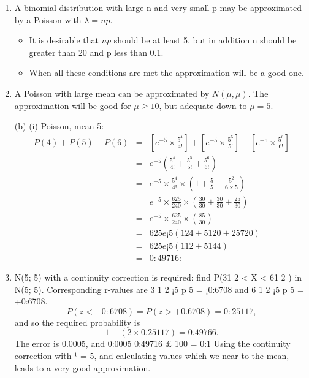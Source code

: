 \documentclass[a4paper,12pt]{article}
\begin{document}
\begin{enumerate}
\item A binomial distribution with large n and very small p may be approximated
by a Poisson with $\lambda = np$. 
\begin{itemize}
\item It is desirable that $np$ should be at least 5, but in
addition n should be greater than 20 and p less than 0.1.

\item When all these conditions are met
the approximation will be a good one.
\end{itemize}

\item  A Poisson with large mean can be approximated by $N(\mu, \mu)$. The
approximation will be good for $\mu \geq 10$, but adequate down to $\mu = 5$.

(b) (i) Poisson, mean 5:
\begin{eqnarray*}
P(4) + P(5) + P(6) &=& 
\left[e^{-5} \times \frac{5^4}{4!}\right] + \left[e^{-5}\times \frac{5^5}{5!}\right] +  \left[ e^{-5}\times \frac{5^6}{6!} \right] 
\\
&=& 
e^{-5} \left( \frac{5^4}{4!} + \frac{5^5}{5!} +  \frac{5^6}{6!} \right)
\\
&=& 
e^{-5} \times \frac{5^4}{4!} \times \left( 1 + \frac{5}{5} +  \frac{5^2}{6 \times 5} \right)
\\
&=& 
e^{-5} \times \frac{625}{240} \times \left(\frac{30}{30} + \frac{30}{30} +  \frac{25}{30} \right)
\\
&=& 
e^{-5} \times \frac{625}{240} \times \left(   \frac{85}{30} \right)
\\
&=& 625e¡5( 1
24 + 5
120 + 25
720 )\\ &=& 625e¡5( 1
12 + 5
144 )\\ &=& 0:49716:
\end{eqnarray*}
\item  N(5; 5) with a continuity correction is required: find P(31
2 < X < 61
2 ) in
N(5; 5). Corresponding r-values are 3 1
2
¡5
p
5
= ¡0:6708 and 6 1
2
¡5
p
5
= +0:6708.
\[P(z < -0:6708) = P(z > +0.6708) = 0:25117,\] and so the required probability
is \[1 - (2 \times 0.25117) = 0.49766.\] The error is 0.0005, and %
0:0005
0:49716 £ 100 = 0:1%
Using the continuity correction with ¹ = 5, and calculating values which we
near to the mean, leads to a very good approximation.


\end{enumerate}
\end{document}
